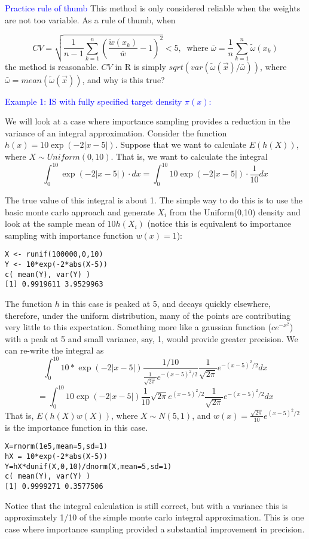 \documentclass[12pt]{article}
\numberwithin{equation}{subsection}
\begin{document}
\noindent
\textcolor{blue}{Practice rule of thumb}
This method is only considered reliable when the weights are not too variable.
As a rule of thumb, when

$$ CV = \sqrt{\frac{1}{n-1} \sum_{k=1}^n \left(\frac{\tilde{w}(x_k)}{\bar{w} } -1\right)^2} < 5, ~ \text{ where } \bar{\omega} = \frac{1}{n}\sum\limits_{k=1}^n\tilde{\omega}(x_k)$$ 
the method is reasonable. $CV$ in R is simply $sqrt(var(\tilde{\omega}(\vec{x})/\bar{\omega}))$, where $\bar{\omega} = mean(\tilde{\omega}(\vec{x}))$, and why is this true?
\newline

\noindent
\textcolor{blue}{Example 1: IS with fully specified target density $\pi(x)$:} 

We will look at a case where importance sampling
provides a reduction in the variance of an integral approximation. Consider the function
$h(x) = 10 \exp (-2|x - 5|)$. Suppose that we want to calculate $E(h(X))$, where $X \sim 
Uniform(0, 10)$. That is, we want to calculate the integral
$$ \int_0^{10} \exp (-2|x - 5|)\cdot dx = \int_0^{10} 10\exp (-2|x - 5|)\cdot\frac{1}{10} dx$$

The true value of this integral is about 1. The simple way to do this is to use the basic monte carlo approach
and generate $X_i$ from the Uniform(0,10) density and look at the sample
mean of $10h(X_i)$ (notice this is equivalent to importance sampling with importance
function $w(x) = 1$):

\begin{verbatim}
X <- runif(100000,0,10)
Y <- 10*exp(-2*abs(X-5))
c( mean(Y), var(Y) )
[1] 0.9919611 3.9529963

\end{verbatim}
The function $h$ in this case is peaked at 5, and decays quickly elsewhere, therefore, under
the uniform distribution, many of the points are contributing very little to this expectation.
Something more like a gaussian function ($ce^{-x^2}$) with a peak at 5 and small variance,
say, 1, would provide greater precision. We can re-write the integral as
$$ \int_0^{10} 10* \exp (-2|x - 5|) \frac{1/10}{\frac{1}{\sqrt{2 \pi}} e^{-(x-5)^2/2} } \frac{1}{\sqrt{2 \pi}} e^{-(x-5)^2/2} dx $$
$$= \int_0^{10} 10\exp (-2|x - 5|) \frac{1}{10}\sqrt{2 \pi} e^{(x-5)^2/2}  \frac{1}{\sqrt{2 \pi}} e^{-(x-5)^2/2} dx $$
That is, $E(h(X)w(X))$, where $X \sim N(5, 1)$, and $w(x) = \frac{\sqrt{2 \pi} }{10}e^{(x-5)^2/2} $ is the importance function in this case.

\begin{verbatim}
X=rnorm(1e5,mean=5,sd=1)
hX = 10*exp(-2*abs(X-5))
Y=hX*dunif(X,0,10)/dnorm(X,mean=5,sd=1)
c( mean(Y), var(Y) )
[1] 0.9999271 0.3577506
\end{verbatim}
Notice that the integral calculation is still correct, but with a variance this is approximately
1/10 of the simple monte carlo integral approximation. This is one case where
importance sampling provided a substantial improvement in precision. \newline
\end{document}
